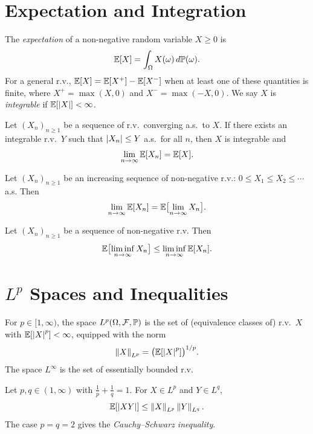 \section{Expectation and Integration}

\begin{definition}[Expectation]
The \emph{expectation} of a non-negative random variable $X \geq 0$ is
\[
  \mathbb{E}[X] = \int_{\Omega} X(\omega) \, d\mathbb{P}(\omega).
\]
For a general r.v., $\mathbb{E}[X] = \mathbb{E}[X^+] - \mathbb{E}[X^-]$ when at least one of these
quantities is finite, where $X^+ = \max(X, 0)$ and $X^- = \max(-X, 0)$.
We say $X$ is \emph{integrable} if $\mathbb{E}[\left| X \right|] < \infty$.
\end{definition}

\begin{theorem}
\label{thm:dom_conv}
Let $(X_n)_{n \geq 1}$ be a sequence of r.v.\ converging a.s.\ to $X$. If there
exists an integrable r.v.\ $Y$ such that $\left| X_n \right| \leq Y$ a.s.\ for all $n$,
then $X$ is integrable and
\[
  \lim_{n \to \infty} \mathbb{E}[X_n] = \mathbb{E}[X].
\]
\end{theorem}

\begin{theorem}
\label{thm:mon_conv}
Let $(X_n)_{n \geq 1}$ be an increasing sequence of non-negative r.v.:
$0 \leq X_1 \leq X_2 \leq \cdots$ a.s. Then
\[
  \lim_{n \to \infty} \mathbb{E}[X_n] = \mathbb{E}\bigl[\lim_{n \to \infty} X_n\bigr].
\]
\end{theorem}

\begin{theorem}
Let $(X_n)_{n \geq 1}$ be a sequence of non-negative r.v. Then
\[
  \mathbb{E}\bigl[\liminf_{n \to \infty} X_n\bigr] \leq \liminf_{n \to \infty} \mathbb{E}[X_n].
\]
\end{theorem}

\section{$L^p$ Spaces and Inequalities}

\begin{definition}[$L^p$ Space]
For $p \in [1, \infty)$, the space $L^p(\Omega, \mathcal{F}, \mathbb{P})$ is the set
of (equivalence classes of) r.v.\ $X$ with $\mathbb{E}[\left| X \right|^p] < \infty$, equipped
with the norm
\[
  \left\| X \right\|_{L^p} = \bigl(\mathbb{E}[\left| X \right|^p]\bigr)^{1/p}.
\]
The space $L^{\infty}$ is the set of essentially bounded r.v.
\end{definition}

\begin{theorem}
Let $p, q \in (1, \infty)$ with $\frac{1}{p} + \frac{1}{q} = 1$. For
$X \in L^p$ and $Y \in L^q$,
\[
  \mathbb{E}[\left| XY \right|] \leq \left\| X \right\|_{L^p} \left\| Y \right\|_{L^q}.
\]
The case $p = q = 2$ gives the \emph{Cauchy--Schwarz inequality}.
\end{theorem}

